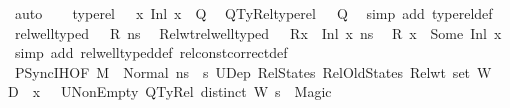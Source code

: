\begin{isabellebody}
\ auto\isanewline
\ \ \isamarkupfalse%
\ {\isacartoucheopen}type{\isacharunderscore}{\kern0pt}rel\ {\isasymLambda}\ {\isasymLambda}{\isacharprime}{\kern0pt}\ {\isacharparenleft}{\kern0pt}{\isacharparenleft}{\kern0pt}x{\isacharcomma}{\kern0pt}\ {\isacharparenleft}{\kern0pt}Inl\ x{}{\isacharparenright}{\kern0pt}{\isacharparenright}{\kern0pt}\ {\isacharhash}{\kern0pt}\ Q{\isacharparenright}{\kern0pt}{\isacartoucheclose}\ \isamarkupfalse%
\ QTyRel{\isacharcolon}{\kern0pt}{\isachardoublequoteopen}type{\isacharunderscore}{\kern0pt}rel\ {\isasymLambda}\ {\isasymLambda}{\isacharprime}{\kern0pt}\ Q{\isachardoublequoteclose}\ \isamarkupfalse%
\ {\isacharparenleft}{\kern0pt}simp\ add{\isacharcolon}{\kern0pt}\ type{\isacharunderscore}{\kern0pt}rel{\isacharunderscore}{\kern0pt}def{\isacharparenright}{\kern0pt}\isanewline
\ \ \isamarkupfalse%
\ {\isacartoucheopen}rel{\isacharunderscore}{\kern0pt}well{\isacharunderscore}{\kern0pt}typed\ {\isasymLambda}\ {\isasymOmega}\ R\ ns{\isacartoucheclose}\ \isamarkupfalse%
\ Rel{\isacharunderscore}{\kern0pt}wt{\isacharcolon}{\kern0pt}{\isacartoucheopen}rel{\isacharunderscore}{\kern0pt}well{\isacharunderscore}{\kern0pt}typed\ {\isasymLambda}\ {\isasymOmega}\ {\isacharparenleft}{\kern0pt}R{\isacharparenleft}{\kern0pt}x\ {\isasymmapsto}\ {\isacharparenleft}{\kern0pt}Inl\ x{}{\isacharparenright}{\kern0pt}{\isacharparenright}{\kern0pt}{\isacharparenright}{\kern0pt}\ ns{\isacartoucheclose}\ \isamarkupfalse%
\ {\isacartoucheopen}R\ x\ {\isacharequal}{\kern0pt}\ Some\ {\isacharparenleft}{\kern0pt}Inl\ x{}{\isacharparenright}{\kern0pt}{\isacartoucheclose}\ \isamarkupfalse%
\ {\isacharparenleft}{\kern0pt}simp\ add{\isacharcolon}{\kern0pt}\ rel{\isacharunderscore}{\kern0pt}well{\isacharunderscore}{\kern0pt}typed{\isacharunderscore}{\kern0pt}def\ rel{\isacharunderscore}{\kern0pt}const{\isacharunderscore}{\kern0pt}correct{\isacharunderscore}{\kern0pt}def{\isacharparenright}{\kern0pt}\isanewline
\ \ \isamarkupfalse%
\ PSync{\isachardot}{\kern0pt}IH{\isacharbrackleft}{\kern0pt}OF\ {\isacartoucheopen}M{\isacharcomma}{\kern0pt}{\isasymLambda}{\isacharcomma}{\kern0pt}{\isasymGamma}{\isacharcomma}{\kern0pt}{\isasymOmega}\ {\isasymturnstile}\ {\isasymlangle}{\isacharbrackleft}{\kern0pt}{\isacharbrackright}{\kern0pt}{\isacharcomma}{\kern0pt}Normal\ ns{\isasymrangle}\ {\isacharbrackleft}{\kern0pt}{\isasymrightarrow}{\isacharbrackright}{\kern0pt}\ s{\isacharprime}{\kern0pt}{\isacartoucheclose}\ U{}Dep\ RelStates\ RelOldStates\ Rel{\isacharunderscore}{\kern0pt}wt\ {\isacartoucheopen}set\ W\ {\isasyminter}\ {\isacharparenleft}{\kern0pt}D{}\ {\isasymunion}\ {\isacharbraceleft}{\kern0pt}x{}{\isacharbraceright}{\kern0pt}{\isacharparenright}{\kern0pt}\ {\isacharequal}{\kern0pt}\ {\isacharbraceleft}{\kern0pt}{\isacharbraceright}{\kern0pt}{\isacartoucheclose}\ U{}NonEmpty\ QTyRel\ {\isacartoucheopen}distinct\ W{\isacartoucheclose}\ {\isacartoucheopen}s{\isacharprime}{\kern0pt}\ {\isasymnoteq}\ Magic{\isacartoucheclose}{\isacharbrackright}{\kern0pt}\isanewline

\end{isabellebody}
